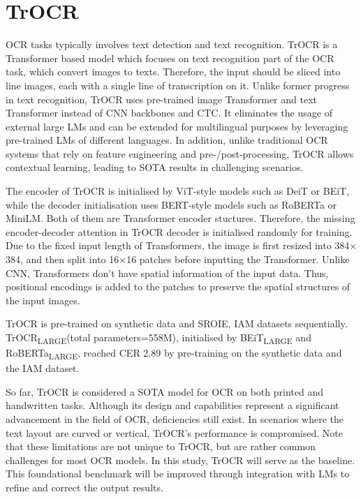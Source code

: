 \label{chap:2_related_work}
\section{TrOCR}
\label{sec:2_trocr}
OCR tasks typically involves text detection and text recognition. TrOCR is a Transformer based model which focuses on text recognition part of the OCR task, which convert images to texts. Therefore, the input should be sliced into line images, each with a single line of transcription on it. Unlike former progress in text recognition, TrOCR uses pre-trained image Transformer and text Transformer instead of CNN backbones and CTC. It eliminates the usage of external large LMs and can be extended for multilingual purposes by leveraging pre-trained LMs of different languages. In addition, unlike traditional OCR systems that rely on feature engineering and pre-/post-processing, TrOCR allows contextual learning, leading to SOTA results in challenging scenarios.

The encoder of TrOCR is initialised by ViT-style models such as DeiT or BEiT, while the decoder initialisation uses BERT-style models such as RoBERTa or MiniLM. Both of them are Transformer encoder stuctures. Therefore, the missing encoder-decoder attention in TrOCR decoder is initialised randomly for training. Due to the fixed input length of Transformers, the image is first resized into 384$\times$384, and then split into 16$\times$16 patches before inputting the Transformer. Unlike CNN, Transformers don't have spatial information of the input data. Thus, positional encodings is added to the patches to preserve the spatial structures of the input images. 

TrOCR is pre-trained on synthetic data and SROIE, IAM datasets sequentially. TrOCR\textsubscript{LARGE}(total parameters=558M), initialised by BEiT\textsubscript{LARGE} and RoBERTa\textsubscript{LARGE}, reached CER 2.89 by pre-training on the synthetic data and the IAM dataset.

So far, TrOCR is considered a SOTA model for OCR on both printed and handwritten tasks. Although its design and capabilities represent a significant advancement in the field of OCR, deficiencies still exist. In scenarios where the text layout are curved or vertical, TrOCR's performance is compromised. Note that these limitations are not unique to TrOCR, but are rather common challenges for most OCR models. In this study, TrOCR will serve as the baseline. This foundational benchmark will be improved through integration with LMs to refine and correct the output results.

